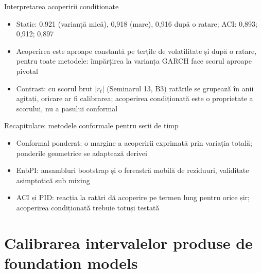 \begin{frame}{Interpretarea acoperirii condiționate}
\itemsize{\small}
\begin{itemize}
    \item Static: 0{,}921 (varianță mică), 0{,}918 (mare), 0{,}916 după o ratare; ACI: 0{,}893; 0{,}912; 0{,}897
    \item Acoperirea este aproape constantă pe terțile de volatilitate și după o ratare, pentru toate metodele: împărțirea la varianța GARCH face scorul aproape pivotal
    \item Contrast: cu scorul brut $|r_t|$ (Seminarul 13, B3) ratările se grupează în anii agitați, oricare ar fi calibrarea; acoperirea condiționată este o proprietate a scorului, nu a pasului conformal
\end{itemize}
\end{frame}

\begin{frame}{Recapitulare: metodele conformale pentru serii de timp}
\itemsize{\small}
\begin{itemize}
    \item Conformal ponderat: o margine a acoperirii exprimată prin variația totală; ponderile geometrice se adaptează derivei
    \item EnbPI: ansambluri bootstrap și o fereastră mobilă de reziduuri, validitate asimptotică sub mixing
    \item ACI și PID: reacția la ratări dă acoperire pe termen lung pentru orice șir; acoperirea condiționată trebuie totuși testată
\end{itemize}
\end{frame}


\section{Calibrarea intervalelor produse de foundation models}


